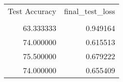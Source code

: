 \begin{tabular}{rr}
\toprule
 Test Accuracy &  final\_test\_loss \\
               &                  \\
\midrule
     63.333333 &         0.949164 \\
     74.000000 &         0.615513 \\
     75.500000 &         0.679222 \\
     74.000000 &         0.655409 \\
\bottomrule
\end{tabular}

